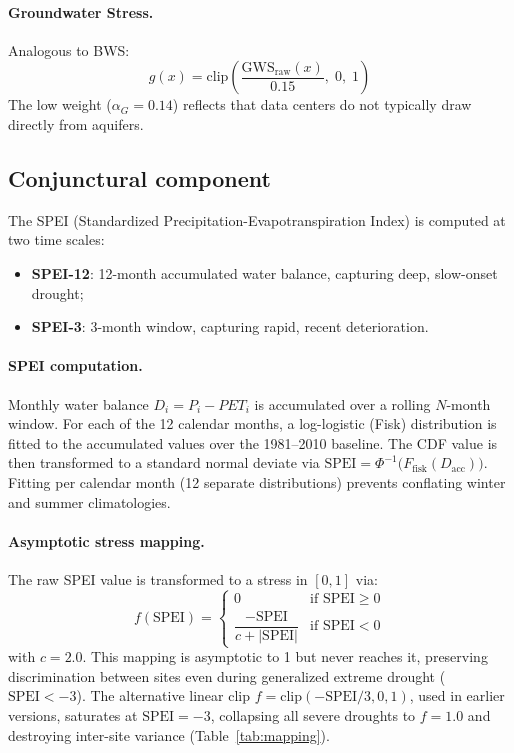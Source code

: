 \documentclass[11pt,a4paper]{article}
\begin{document}
\paragraph{Groundwater Stress.} Analogous to BWS:
\begin{equation}
g(x) = \text{clip}\!\left(\frac{\text{GWS}_{\text{raw}}(x)}{0.15},\; 0,\; 1\right)
\end{equation}
The low weight ($\alpha_G = 0.14$) reflects that data centers do not typically draw directly from aquifers.

\subsection{Conjunctural component}

The SPEI (Standardized Precipitation-Evapotranspiration Index) is computed at two time scales:
\begin{itemize}
  \item \textbf{SPEI-12}: 12-month accumulated water balance, capturing deep, slow-onset drought;
  \item \textbf{SPEI-3}: 3-month window, capturing rapid, recent deterioration.
\end{itemize}

\paragraph{SPEI computation.} Monthly water balance $D_i = P_i - PET_i$ is accumulated over a rolling $N$-month window. For each of the 12 calendar months, a log-logistic (Fisk) distribution is fitted to the accumulated values over the 1981--2010 baseline. The CDF value is then transformed to a standard normal deviate via $\text{SPEI} = \Phi^{-1}\bigl(F_{\text{fisk}}(D_{\text{acc}})\bigr)$. Fitting per calendar month (12 separate distributions) prevents conflating winter and summer climatologies.

\paragraph{Asymptotic stress mapping.} The raw SPEI value is transformed to a stress in $[0,1]$ via:
\begin{equation}
f(\text{SPEI}) = \begin{cases}
0 & \text{if } \text{SPEI} \geq 0 \\[4pt]
\dfrac{-\text{SPEI}}{c + |\text{SPEI}|} & \text{if } \text{SPEI} < 0
\end{cases}
\label{eq:asymptotic}
\end{equation}
with $c = 2.0$. This mapping is asymptotic to 1 but never reaches it, preserving discrimination between sites even during generalized extreme drought ($\text{SPEI} < -3$). The alternative linear clip $f = \text{clip}(-\text{SPEI}/3, 0, 1)$, used in earlier versions, saturates at $\text{SPEI} = -3$, collapsing all severe droughts to $f = 1.0$ and destroying inter-site variance (Table~\ref{tab:mapping}).
\end{document}
